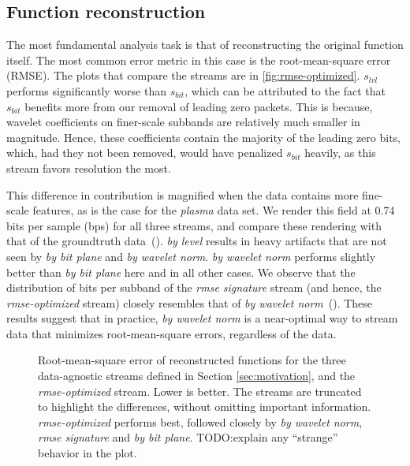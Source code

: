 \subsection{Function reconstruction}\label{sec:rmse-optimized}

The most fundamental analysis task is that of reconstructing the original function itself. The most
common error metric in this case is the root-mean-square error (RMSE). The plots that compare the
streams are in \autoref{fig:rmse-optimized}. $s_{lvl}$ performs significantly worse than $s_{bit}$,
which can be attributed to the fact that $s_{bit}$ benefits more from our removal of leading zero
packets. This is because, wavelet coefficients on finer-scale subbands are relatively much smaller
in magnitude. Hence, these coefficients contain the majority of the leading zero bits, which, had
they not been removed, would have penalized $s_{bit}$ heavily, as this stream favors resolution the
most.

This difference in contribution is magnified when the data contains more fine-scale features, as is
the case for the \emph{plasma} data set. We render this field at
0.74 bits per sample (bps) for all three streams, and compare these rendering with that of the
groundtruth data~(). \emph{by level} results in heavy artifacts that are not seen by \emph{by bit
plane} and \emph{by wavelet norm}. \emph{by wavelet norm} performs slightly better than \emph{by bit
plane} here and in all other cases. We observe that
the distribution of bits per subband of the \emph{rmse signature} stream (and hence, the
\emph{rmse-optimized} stream) closely resembles that of \emph{by wavelet norm}~(). These results
suggest that in practice, \emph{by wavelet norm} is a near-optimal way to stream data that minimizes
root-mean-square errors, regardless of the data.

\begin{figure}[h]
  \centering
  \caption{Root-mean-square error of reconstructed functions for the three data-agnostic streams
  defined in Section \ref{sec:motivation}, and the \emph{rmse-optimized} stream. Lower is better.
  The streams are truncated to highlight the differences, without omitting important information.
  \emph{rmse-optimized} performs best, followed closely by \emph{by wavelet norm}, \emph{rmse
  signature} and \emph{by bit plane}. TODO:explain any ``strange'' behavior in the
  plot.}\label{fig:rmse-optimized}
\end{figure}

